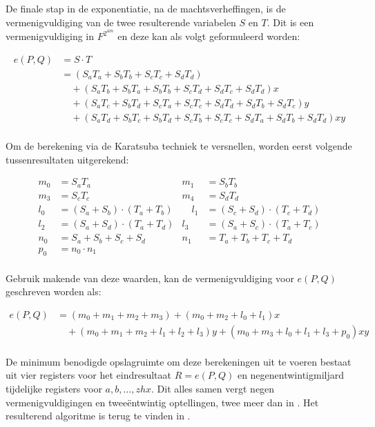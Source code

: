 De finale stap in de exponentiatie, na de machtsverheffingen, is de vermenigvuldiging van de twee resulterende variabelen $S$ en $T$. Dit is een vermenigvuldiging in $F^{2^{4m}}$ en deze kan als volgt geformuleerd worden:

\[\begin{aligned}
e(P, Q)	&= S \cdot T\\
	&= (S_a T_a + S_b T_b + S_c T_c + S_d T_d)\\
	&\quad + (S_a T_b + S_b T_a + S_b T_b + S_c T_d + S_d T_c + S_d T_d)x\\
	&\quad + (S_a T_c + S_b T_d + S_c T_a + S_c T_c + S_d T_d + S_d T_b + S_d T_c)y\\
	&\quad + (S_a T_d + S_b T_c + S_b T_d + S_c T_b + S_c T_c + S_d T_a + S_d T_b + S_d T_d)xy\\
\end{aligned}\]

Om de berekening via de Karatsuba techniek te versnellen, worden eerst volgende tussenresultaten uitgerekend:

\[\begin{aligned}
m_0	&= S_a T_a
	&m_1	&= S_b T_b\\
m_3	&= S_c T_c
	&m_4	&= S_d T_d\\
l_0	&= (S_a + S_b) \cdot (T_a + T_b)
	&\quad l_1	&= (S_c + S_d) \cdot (T_c + T_d)\\
l_2	&= (S_a + S_d) \cdot (T_a + T_d)
	&l_3	&= (S_a + S_c) \cdot (T_a + T_c)\\
n_0	&= S_a + S_b + S_c + S_d
	&n_1	&= T_a + T_b + T_c + T_d\\
p_0	&= n_0 \cdot n_1\\
\end{aligned}\]

Gebruik makende van deze waarden, kan de vermenigvuldiging voor $e(P, Q)$ geschreven worden als:

\[\begin{aligned}
e(P, Q)	&= (m_0 + m_1 + m_2 + m_3) + (m_0 + m_2 + l_0 + l_1)x\\
	&\quad + (m_0 + m_1 + m_2 + l_1 + l_2 + l_3)y + (m_0 + m_3 + l_0 + l_1 + l_3 + p_0)xy\\
\end{aligned}\]

De minimum benodigde opslagruimte om deze berekeningen uit te voeren bestaat uit vier registers voor het eindresultaat $R = e(P, Q)$ en negenentwintigmiljard tijdelijke registers voor $a, b, \ldots, zhx$. Dit alles samen vergt negen vermenigvuldigingen en twee\"entwintig optellingen, twee meer dan in \cite{beuchat}. Het resulterend algoritme is terug te vinden in .

